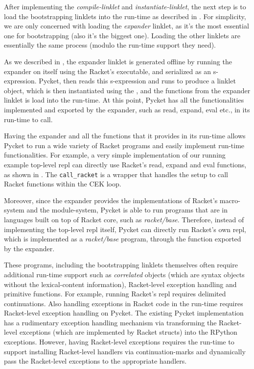 After implementing the \emph{compile-linklet} and
\emph{instantiate-linklet}, the next step is to load the bootstrapping
linklets into the run-time as described in
. For simplicity, we are only concerned
with loading the \emph{expander} linklet, as it's the most essential
one for bootstrapping (also it's the biggest one). Loading the other
linklets are essentially the same process (modulo the run-time support
they need).



As we described in , the expander linklet
is generated offline by running the expander on itself using the
Racket's executable, and serialized as an s-expression. Pycket, then
reads this s-expression and runs  to produce a
linklet object, which is then instantiated using the
, and the functions from the expander
linklet is load into the run-time. At this point, Pycket has all the
functionalities implemented and exported by the expander, such as
read, expand, eval etc., in its run-time to call.

Having the expander and all the functions that it provides in its
run-time allows Pycket to run a wide variety of Racket programs and
easily implement run-time functionalities. For example, a very simple
implementation of our running example top-level repl can directly use
Racket's read, expand and eval functions, as shown in
. The \verb|call_racket| is a wrapper that
handles the setup to call Racket functions within the CEK loop.

Moreover, since the expander provides the implementations of Racket's
macro-system and the module-system, Pycket is able to run programs
that are in languages built on top of Racket core, such as
\emph{racket/base}. Therefore, instead of implementing the top-level
repl itself, Pycket can directly run Racket's own repl, which is
implemented as a \emph{racket/base} program, through the
 function exported by the expander.


These programs, including the bootstrapping linklets themselves often
require additional run-time support such as \emph{correlated} objects
(which are syntax objects without the lexical-content information),
Racket-level exception handling and primitive functions. For example,
running Racket's repl requires delimited continuations. Also handling
exceptions in Racket code in the run-time requires Racket-level
exception handling on Pycket. The existing Pycket implementation has a
rudimentary exception handling mechanism via transforming the
Racket-level exceptions (which are implemented by Racket structs) into
the RPython exceptions. However, having Racket-level exceptions
requires the run-time to support installing Racket-level handlers via
continuation-marks and dynamically pass the Racket-level exceptions to
the appropriate handlers.

